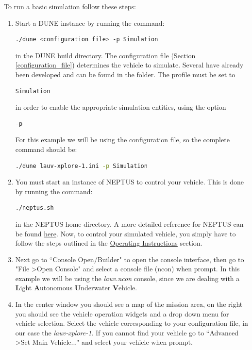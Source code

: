 \documentclass[10pt,a4paper]{article}
\begin{document}
To run a basic simulation follow these steps:

\begin{enumerate}
\item Start a DUNE instance by running the command:

\begin{lstlisting}[language=bash, frame=single]
  ./dune <configuration file> -p Simulation
\end{lstlisting}

in the DUNE build directory. The configuration file (Section \ref{configuration_file}) determines the vehicle to simulate. Several have already been developed and can be found in the  folder. The profile must be set to 
\begin{lstlisting}[language=bash, frame=single]
  Simulation
\end{lstlisting}
in order to enable the appropriate simulation entities,  using the option 
\begin{lstlisting}[language=bash, frame=single]
  -p
\end{lstlisting}
For this example we will be using the  configuration file, so the complete command should be:
\begin{lstlisting}[language=bash, frame=single]
  ./dune lauv-xplore-1.ini -p Simulation
\end{lstlisting}

\item You must start an instance of NEPTUS to control your vehicle. This is done by running the command:
\begin{lstlisting}[language=bash, frame=single]
  ./neptus.sh
\end{lstlisting}
in the NEPTUS home directory. A more detailed reference for NEPTUS can be found \href{https://lsts.pt/neptus/manual/trunk/index.html}{here}. Now, to control your simulated vehicle, you simply have to follow the steps outlined in the \href{https://whale.fe.up.pt/neptus/manual/trunk/commonTasks.html#operating-instructions}{Operating Instructions} section.


\iffalse
\item Next go to ``Console Open/Builder" to open the console interface, then go to "File \textgreater Open Console" and select a console file (ncon) when prompt. In this example we will be using the \textit{lauv.ncon} console, since we are dealing with a \textbf{L}ight \textbf{A}utonomous \textbf{U}nderwater \textbf{V}ehicle.

\item In the center window you should see a map of the mission area, on the right you should see the vehicle operation widgets and a drop down menu for vehicle selection. Select the vehicle corresponding to your configuration file, in our case the \textit{lauv-xplore-1}. If you cannot find your vehicle go to ``Advanced \textgreater Set Main Vehicle..." and select your vehicle when prompt.


\end{enumerate}
\end{document}
